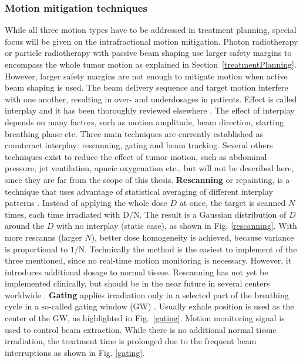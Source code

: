 \documentclass[type=dr, dr=rernat, accentcolor=tud7b,colorbacktitle, bigchapter, openright, twoside, 12pt ]{tudthesis}
\begin{document}
\subsubsection{Motion mitigation techniques}

While all three motion types have to be addressed in treatment planning, special focus will be given on the intrafractional motion mitigation. Photon radiotherapy or particle radiotherapy with passive beam shaping 
use larger safety margins to encompass the whole tumor motion as explained in Section~\ref{treatmentPlanning}. However, larger safety margins are not enough to mitigate motion when active beam shaping is used. The beam delivery 
sequence and target motion interfere with one another, resulting in over- and underdosages in patients. Effect is called interplay and it has been thoroughly reviewed elsewhere \cite{Phillips1992,Bert2008}. The effect of interplay depends
on many factors, such as motion amplitude, beam direction, starting breathing phase etc. Three main techniques are currently established as counteract interplay: rescanning, gating and beam tracking. Several others techniques exist
to reduce the effect of tumor motion, such as abdominal pressure, jet ventilation, apneic oxygenation etc., but will not be described here, since they are far from the scope of this thesis.
\newline
\textbf{Rescanning} or repainting, is a technique that uses advantage of statistical averaging of different interplay patterns \cite{Phillips1992}. Instead of applying the whole dose $D$ at once, the target is scanned $N$ times, each
time irradiated with $\mathrm{D}/\mathrm{N}$. The result is a Gaussian distribution of $D$ around the $D$ with no interplay (static case), as shown in Fig. \ref{rescanning}. With more rescanns (larger $N$), better dose homogeneity is achieved, because variance is proportional
to $\mathrm{1}/\mathrm{N}$. Technically the method is the easiest to implement of the three mentioned, since no real-time motion monitoring is necessary. However, it introduces additional dosage to normal tissue. Rescanning has not yet be
implemented clinically, but should be in the near future in several centers worldwide \cite{Furukawa2007, Zenklusen2010}.
\newline
\textbf{Gating} applies irradiation only in a selected part of the breathing cycle in a so-called gating window (GW) \cite{Minohara2000,Lu2006}. Usually exhale position is used as the center of the GW, as highlighted in Fig.~\ref{gating}.
Motion monitoring signal is used to control beam extraction. While there is no additional normal tissue irradiation, the treatment time is prolonged due to the frequent beam interruptions as shown in Fig. \ref{gating}.
\end{document}
